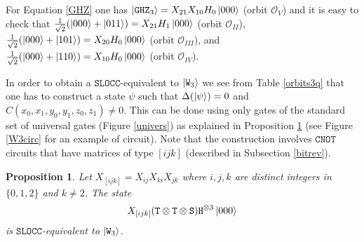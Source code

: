 \documentclass[a4paper,12pt,fleqn]{article}
\newcommand\SLOCC{\mathtt{SLOCC}}
\newcommand\W{\mathtt{W}}
\newcommand\GHZ{\mathtt{GHZ}}
\newcommand\cnot{\mathtt{CNOT}}
\newtheorem{prop}[theo]{Proposition}
\begin{document}
  For Equation \eqref{GHZ} one has $\ket{\GHZ_3}=X_{21}X_{10}H_0\ket{000}$ (orbit $\mathcal{O}_{V}$) and it is easy to check that
  $\frac{1}{\sqrt2}(\ket{000}+\ket{011})=X_{21}H_1\ket{000}$ (orbit $\mathcal{O}_{II}$),
  $\frac{1}{\sqrt2}(\ket{000}+\ket{101})=X_{20}H_0\ket{000}$ (orbit $\mathcal{O}_{III}$), and
  $\frac{1}{\sqrt2}(\ket{000}+\ket{110})=X_{10}H_0\ket{000}$ (orbit $\mathcal{O}_{IV}$).
  
  In order to obtain a $\SLOCC$-equivalent to $\ket{\W_3}$ we see from Table \ref{orbits3q} that one has to construct a state $\psi$
  such that $\Delta(\ket{\psi})=0$ and $C(x_0,x_1,y_0,y_1,z_0,z_1)\neq 0$. This can be done using only gates of the standard set of universal gates (Figure \ref{univers})
as explained in Proposition \ref{W3} (see Figure \ref{W3circ} for an example of circuit).
  Note that the construction involves $\cnot$ circuits that have matrices of type $[ijk]$ (described in Subsection \ref{bitrev}). 

  \begin{prop}\label{W3}
    Let $X_{[ijk]}=X_{ij}X_{ki}X_{jk}$ where $i,j,k$ are distinct integers in $\{0,1,2\}$ and $k\neq 2$. The state
    \begin{equation}
X_{[ijk]}(\mathtt{T}\otimes\mathtt{T}\otimes\mathtt{S})\mathtt{H}^{\otimes 3}\ket{000}
      \end{equation}
is $\SLOCC$-equivalent to $\ket{\W_3}$.
  \end{prop}
\end{document}
